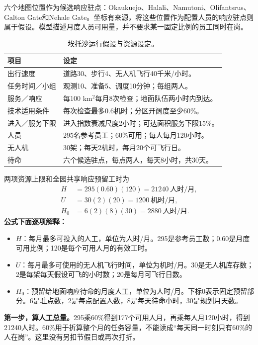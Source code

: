 \documentclass[12pt,a4paper]{article}
\numberwithin{equation}{section}
\begin{document}
六个地图位置作为候选响应驻点：Okaukuejo、Halali、Namutoni、Olifantsrus、Galton Gate和Nehale Gate。坐标有来源，将这些位置作为配置人员的响应驻点则属于假设。模型描述月度人员可用量，并不要求某一固定比例的员工同时在岗。

\begin{table}[H]
\centering\normalsize
\caption{埃托沙运行假设与资源设定。}
\label{tab:parameters}
\begin{tabularx}{\linewidth}{>{\raggedright\arraybackslash}p{4.0cm}>{\raggedright\arraybackslash}X}
\toprule
项目 & 设定 \\
\midrule
出行速度 & 道路30、步行4、无人机飞行40千米/小时。 \\
任务时间／小组 & 观测10、准备5、调度10分钟；每组两人。 \\
服务／响应 & 每100 km$^2$每月8次检查；地面队伍两小时内到达。 \\
技术适用条件 & 每次检查最多0.6机时；分区开阔度至少60\%。 \\
进入／服务下限 & 进入指数衰减尺度2小时；可达面积服务下限15\%。 \\
人员 & 295名参考员工；60\%可用；每人每月120小时。 \\
无人机 & 30架；每天2机时，每月20个可飞行日。 \\
待命 & 六个候选驻点，每点两人，每天8小时，共30天。 \\
\bottomrule
\end{tabularx}
\end{table}

两项资源上限和全园共享响应预留工时为
\begin{equation}
\begin{aligned}
H&=295(0.60)(120)=21240\ \text{人时/月},\\
U&=30(2)(20)=1200\ \text{机时/月},\\
H_0&=6(2)(8)(30)=2880\ \text{人时/月}.
\end{aligned}
\label{eq:budgets}
\end{equation}
\noindent\textbf{公式下面逐项解释：}
\begin{itemize}
\item $H$：每月最多可投入的人工，单位为人时/月。295是参考员工数；0.60是月度可用比例；120是每个可用人月的有效工时。
\item $U$：每月最多可使用的无人机飞行时间，单位为机时/月。30是无人机库存数；2是每架每天假设可飞的小时数；20是每月可飞行日数。
\item $H_0$：预留给地面响应待命的月度人工，单位为人时/月。下标0表示固定预留部分。6是驻点数，2是每点配置人数，8是每天待命小时，30是规划月天数。
\end{itemize}
\noindent\textbf{第一步，算人工总量。}295乘60\%得到177个可用人月，再乘每人月120小时，得到21240人时。60\%用于折算整个月的任务容量，不能读成“每天同一时刻只有60\%的人在岗”。这里没有另扣节假日或再次打折。
\end{document}
